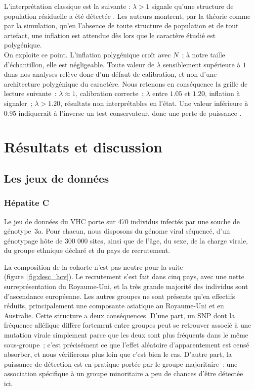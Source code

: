 \documentclass[11pt,a4paper]{article}
\begin{document}
L'interprétation classique est la suivante : $\lambda > 1$ signale qu'une structure de population résiduelle a été
détectée \cite{lambda}. Les auteurs montrent, par la théorie
comme par la simulation, qu'en l'absence de toute structure de population et de tout artefact,
 une inflation est attendue dès lors que le caractère étudié est
polygénique.
\\
On exploite ce point. L'inflation polygénique croît avec $N$~; à notre taille
d'échantillon, elle est négligeable. Toute valeur de $\lambda$ sensiblement supérieure à $1$ dans
nos analyses relève donc d'un défaut de calibration, et non d'une architecture polygénique du
caractère. Nous retenons en conséquence la grille de lecture suivante~: $\lambda \approx 1$,
calibration correcte~; $\lambda$ entre $1.05$ et $1.20$, inflation à signaler~; $\lambda > 1.20$,
résultats non interprétables en l'état. Une valeur inférieure à $0.95$ indiquerait à l'inverse un
test conservateur, donc une perte de puissance \cite{tuto}.

\vspace{1cm}
\newpage



\section{Résultats et discussion}
 
\subsection{Les jeux de données}
 
\subsubsection{Hépatite C}
 
Le jeu de données du VHC porte sur 470 individus infectés par une souche de génotype~3a.
Pour chacun, nous disposons du génome viral séquencé, d'un génotypage hôte de 300 000 sites, ainsi que
de l'âge, du sexe, de la charge virale, du groupe ethnique déclaré et du pays de recrutement.
 
La composition de la cohorte n'est pas neutre pour la suite (figure~\ref{fig:desc_hcv}). Le
recrutement s'est fait dans cinq pays, avec une nette surreprésentation du Royaume-Uni, et la
très grande majorité des individus sont d'ascendance européenne. Les autres groupes ne sont
présents qu'en effectifs réduits, principalement une composante asiatique au Royaume-Uni et en
Australie. Cette structure a deux conséquences. D'une part, un SNP dont la fréquence allélique
diffère fortement entre groupes peut se retrouver associé à une mutation virale simplement parce
que les deux sont plus fréquents dans le même sous-groupe~; c'est précisément ce que l'effet
aléatoire d'apparentement est censé absorber, et nous vérifierons plus loin que c'est bien le cas.
D'autre part, la puissance de détection est en pratique portée par le groupe majoritaire~: une
association spécifique à un groupe minoritaire a peu de chances d'être détectée ici.
 
\end{document}
